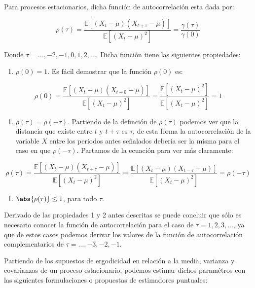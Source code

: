\documentclass[
  a4paper,
]{article}
\providecommand{\tightlist}{%
  \setlength{\itemsep}{0pt}\setlength{\parskip}{0pt}}\usepackage{longtable,booktabs,array}
\begin{document}
Para procesos estacionarios, dicha función de autocorrelación esta dada
por:

\[
\rho(\tau) = \frac{\mathbb{E}[(X_t - \mu)(X_{t+\tau} - \mu)]}{\mathbb{E}[(X_t - \mu)^2]} = \frac{\gamma(\tau)}{\gamma(0)} 
\]

Donde \(\tau = \ldots, -2, -1, 0, 1, 2, \ldots\). Dicha función tiene
las siguientes propiedades:

\begin{enumerate}
\def\labelenumi{\arabic{enumi}.}
\tightlist
\item
  \(\rho(0) = 1\). Es fácil demostrar que la función \(\rho(0)\) es:
\end{enumerate}

\[
\rho(0) = \frac{\mathbb{E}[(X_t - \mu)(X_{t + 0} - \mu)]}{\mathbb{E}[(X_t - \mu)^2]} = \frac{\mathbb{E}[(X_t - \mu)^2]}{\mathbb{E}[(X_t - \mu)^2]} = 1
\]

\begin{enumerate}
\def\labelenumi{\arabic{enumi}.}
\tightlist
\item
  \(\rho(\tau) = \rho(-\tau)\). Partiendo de la definción de
  \(\rho(\tau)\) podemos ver que la distancia que existe entre \(t\) y
  \(t + \tau\) es \(\tau\), de esta forma la autocorrelación de la
  variable \(X\) entre los periodos antes señalados debería ser la misma
  para el caso en que \(\rho(-\tau)\). Partamos de la ecuación para ver
  más claramente:
\end{enumerate}

\[
\rho(\tau) = \frac{\mathbb{E}[(X_t - \mu)(X_{t + \tau} - \mu)]}{\mathbb{E}[(X_t - \mu)^2]} = \frac{\mathbb{E}[(X_t - \mu)(X_{t - \tau} - \mu)]}{\mathbb{E}[(X_t - \mu)^2]} = \rho(-\tau)
\]

\begin{enumerate}
\def\labelenumi{\arabic{enumi}.}
\tightlist
\item
  \(\abs{\rho(\tau)} \leq 1\), para todo \(\tau\).
\end{enumerate}

Derivado de las propiedades 1 y 2 antes descritas se puede concluir que
sólo es necesario conocer la función de autocorrelación para el caso de
\(\tau = 1, 2, 3, \ldots\), ya que de estos casos podemos derivar los
valores de la función de autocorrelación complementarios de
\(\tau = \ldots, -3, -2, -1\).

Partiendo de los supuestos de ergodicidad en relación a la media,
varianza y covarianzas de un proceso estacionario, podemos estimar
dichos paramétros con las siguientes formulaciones o propuestas de
estimadores puntuales:
\end{document}
